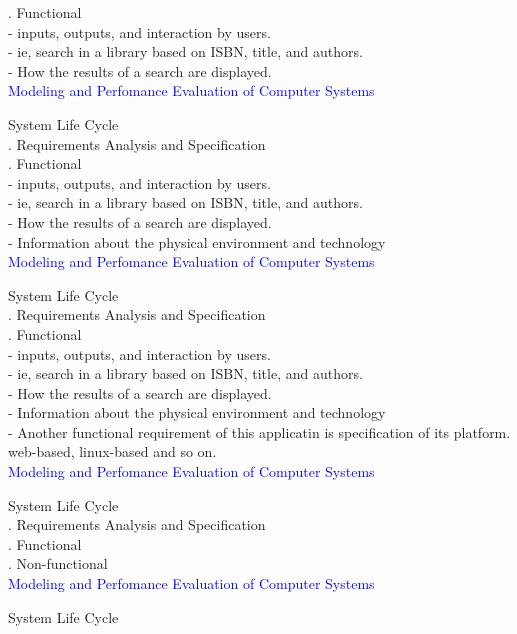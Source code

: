\documentclass[svgnames]{beamer}
\begin{document}
. Functional \\[20pt]
- inputs, outputs, and interaction by users.\\
- ie, search in a library based on ISBN, title, and authors.\\
- How the results of a search are displayed. \\
\newpage
\textcolor{blue}{Modeling and Perfomance Evaluation of Computer Systems} \\[38pt]
\raggedright
\! System Life Cycle\\
. Requirements Analysis and Specification\\
. Functional \\[20pt]
- inputs, outputs, and interaction by users.\\
- ie, search in a library based on ISBN, title, and authors.\\
- How the results of a search are displayed. \\
- Information about the physical environment and technology\\
\newpage
\textcolor{blue}{Modeling and Perfomance Evaluation of Computer Systems} \\[38pt]
\raggedright
\! System Life Cycle\\
. Requirements Analysis and Specification\\
. Functional \\[20pt]
- inputs, outputs, and interaction by users.\\
- ie, search in a library based on ISBN, title, and authors.\\
- How the results of a search are displayed. \\
- Information about the physical environment and technology\\
- Another functional requirement of this applicatin is specification of its platform. web-based, linux-based and so on.\\
\newpage
\textcolor{blue}{Modeling and Perfomance Evaluation of Computer Systems} \\[38pt]
\raggedright
\! System Life Cycle\\
. Requirements Analysis and Specification\\
. Functional\\
. Non-functional\\
\newpage
\textcolor{blue}{Modeling and Perfomance Evaluation of Computer Systems} \\[38pt]
\raggedright
\! System Life Cycle\\
\end{document}
